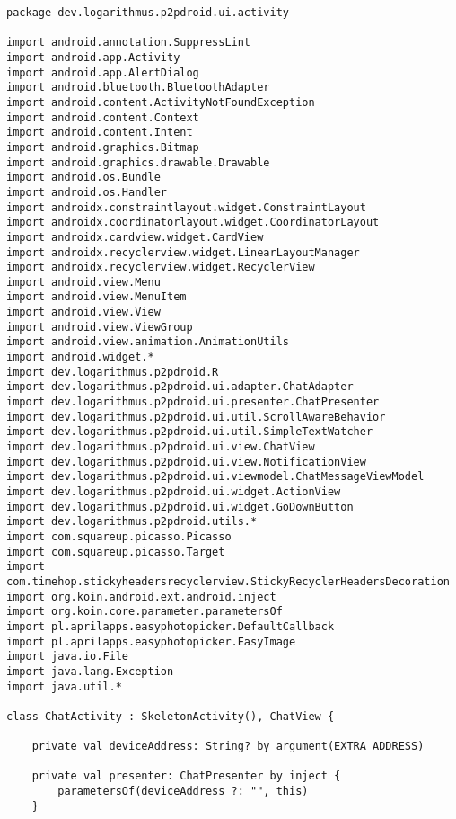 
\label{sec:source_code}

\begin{lstlisting}
package dev.logarithmus.p2pdroid.ui.activity

import android.annotation.SuppressLint
import android.app.Activity
import android.app.AlertDialog
import android.bluetooth.BluetoothAdapter
import android.content.ActivityNotFoundException
import android.content.Context
import android.content.Intent
import android.graphics.Bitmap
import android.graphics.drawable.Drawable
import android.os.Bundle
import android.os.Handler
import androidx.constraintlayout.widget.ConstraintLayout
import androidx.coordinatorlayout.widget.CoordinatorLayout
import androidx.cardview.widget.CardView
import androidx.recyclerview.widget.LinearLayoutManager
import androidx.recyclerview.widget.RecyclerView
import android.view.Menu
import android.view.MenuItem
import android.view.View
import android.view.ViewGroup
import android.view.animation.AnimationUtils
import android.widget.*
import dev.logarithmus.p2pdroid.R
import dev.logarithmus.p2pdroid.ui.adapter.ChatAdapter
import dev.logarithmus.p2pdroid.ui.presenter.ChatPresenter
import dev.logarithmus.p2pdroid.ui.util.ScrollAwareBehavior
import dev.logarithmus.p2pdroid.ui.util.SimpleTextWatcher
import dev.logarithmus.p2pdroid.ui.view.ChatView
import dev.logarithmus.p2pdroid.ui.view.NotificationView
import dev.logarithmus.p2pdroid.ui.viewmodel.ChatMessageViewModel
import dev.logarithmus.p2pdroid.ui.widget.ActionView
import dev.logarithmus.p2pdroid.ui.widget.GoDownButton
import dev.logarithmus.p2pdroid.utils.*
import com.squareup.picasso.Picasso
import com.squareup.picasso.Target
import com.timehop.stickyheadersrecyclerview.StickyRecyclerHeadersDecoration
import org.koin.android.ext.android.inject
import org.koin.core.parameter.parametersOf
import pl.aprilapps.easyphotopicker.DefaultCallback
import pl.aprilapps.easyphotopicker.EasyImage
import java.io.File
import java.lang.Exception
import java.util.*

class ChatActivity : SkeletonActivity(), ChatView {

    private val deviceAddress: String? by argument(EXTRA_ADDRESS)

    private val presenter: ChatPresenter by inject {
        parametersOf(deviceAddress ?: "", this)
    }


\end{lstlisting}
